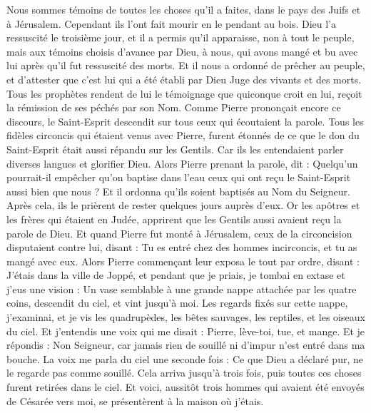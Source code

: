 \begin{multicols}{2}
Nous sommes témoins de toutes les choses qu'il a faites, dans le pays des Juifs et à Jérusalem. Cependant ils l'ont fait mourir en le pendant au bois.
Dieu l'a ressuscité le troisième jour, et il a permis qu’il apparaisse,
non à tout le peuple, mais aux témoins choisis d’avance par Dieu, à nous, qui avons mangé et bu avec lui après qu'il fut ressuscité des morts.
Et il nous a ordonné de prêcher au peuple, et d’attester que c'est lui qui a été établi par Dieu Juge des vivants et des morts.
Tous les prophètes rendent de lui le témoignage que quiconque croit en lui, reçoit la rémission de ses péchés par son Nom.
Comme Pierre prononçait encore ce discours, le Saint-Esprit descendit sur tous ceux qui écoutaient la parole.
Tous les fidèles circoncis qui étaient venus avec Pierre, furent étonnés de ce que le don du Saint-Esprit était aussi répandu sur les Gentils.
Car ils les entendaient parler diverses langues et glorifier Dieu.
Alors Pierre prenant la parole, dit : Quelqu’un pourrait-il empêcher qu’on baptise dans l’eau ceux qui ont reçu le Saint-Esprit aussi bien que nous ?
Et il ordonna qu'ils soient baptisés au Nom du Seigneur. Après cela, ils le prièrent de rester quelques jours auprès d’eux.
\VerseOne{}Or les apôtres et les frères qui étaient en Judée, apprirent que les Gentils aussi avaient reçu la parole de Dieu.
Et quand Pierre fut monté à Jérusalem, ceux de la circoncision disputaient contre lui,
disant : Tu es entré chez des hommes incirconcis, et tu as mangé avec eux.
Alors Pierre commençant leur exposa le tout par ordre, disant :
J’étais dans la ville de Joppé, et pendant que je priais, je tombai en extase et j’eus une vision : Un vase semblable à une grande nappe attachée par les quatre coins, descendit du ciel, et vint jusqu'à moi.
Les regards fixés sur cette nappe, j’examinai, et je vis les quadrupèdes, les bêtes sauvages, les reptiles, et les oiseaux du ciel.
Et j’entendis une voix qui me disait : Pierre, lève-toi, tue, et mange.
Et je répondis : Non Seigneur, car jamais rien de souillé ni d’impur n’est entré dans ma bouche.
La voix me parla du ciel une seconde fois : Ce que Dieu a déclaré pur, ne le regarde pas comme souillé.
Cela arriva jusqu'à trois fois, puis toutes ces choses furent retirées dans le ciel.
Et voici, aussitôt trois hommes qui avaient été envoyés de Césarée vers moi, se présentèrent à la maison où j'étais.

\end{multicols}
